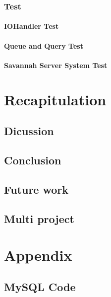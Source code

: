     \subsection{Test}
      
      \subsubsection{IOHandler Test}
      
      \subsubsection{Queue and Query Test}
      
      \subsubsection{Savannah Server System Test}
      

\chapter{Recapitulation}
\label{recap}
  \section{Dicussion}
    \label{sect:disc}
    
  
  \section{Conclusion}
    
  \section{Future work}
  	
  \section{Multi project} %
  	


\appendix
    \chapter{Appendix}
    \section{MySQL Code}
    \label{MySQLcode}
      
